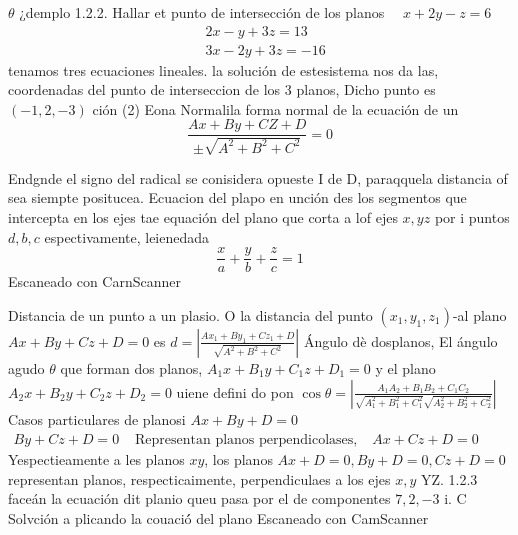 

$\theta$
¿demplo 1.2.2. Hallar et punto de intersección de los planos $\quad x+2 y-z=6$
$$
\begin{aligned}
	& 2 x-y+3 z=13 \\
	& 3 x-2 y+3 z=-16
\end{aligned}
$$
tenamos tres ecuaciones lineales. la solución de estesistema nos da las, coordenadas del punto de interseccion de los 3 planos, Dicho punto es $(-1,2,-3)$
ción
(2) Eona Normalila forma normal de la ecuación de un
$$
\frac{A x+B y+C Z+D}{ \pm \sqrt{A^2+B^2+C^2}}=0
$$

Endgnde el signo del radical se conisidera opueste I de D, paraqquela distancia of sea siempte positucea. Ecuacion del plapo en unción des los segmentos que intercepta en los ejes
tae equación del plano que corta a lof ejes $x, y z$ por i puntos $d, b, c$ espectivamente, leienedada
$$
\frac{x}{a}+\frac{y}{b}+\frac{z}{c}=1
$$
Escaneado con CarnScanner




Distancia de un punto a un plasio.
O la distancia del punto $\left(x_1, y_1, z_1\right)$-al plano
$A x+B y+C z+D=0$ es $d=\left|\frac{A x_1+B y_1+C z_1+D}{\sqrt{A^2+B^2+C^2}}\right|$
Ángulo dè dosplanos,
El ángulo agudo $\theta$ que forman dos planos, $A_1 x+B_1 y+C_1 z+D_1=0$ y el plano $A_2 x+B_2 y+C_2 z+D_2=0$ uiene defini do pon $\cos \theta=\left|\frac{A_1 A_2+B_1 B_2+C_1 C_2}{\sqrt{A_1^2+B_1^2+C_1^2} \sqrt{A_2^2+B_2^2+C_2^2}}\right|$
Casos particulares de planosi
$A x+B y+D=0$
$\begin{array}{ll}B y+C z+D=0 & \text { Representan planos perpendicolases, }\end{array}$ $A x+C z+D=0 \quad$ Yespectieamente a les planos $x y$,
los planos $A x+D=0, B y+D=0, C z+D=0$ representan planos, respecticaimente, perpendiculaes a los ejes $x, y$ YZ.
1.2.3 faceán la ecuación dit planio queu pasa por el de componentes $7,2,-3$ i.
C
Solvción a plicando la couació́ del plano
Escaneado con CamScanner




